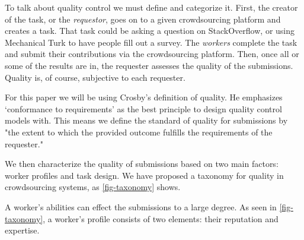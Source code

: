\documentclass{sig-alternate-05-2015}
\begin{document}
	To talk about quality control we must define and categorize it. First, the creator of the task, or the \emph{requestor}, goes on to a given crowdsourcing platform and creates a task. That task could be asking a question on StackOverflow, or using Mechanical Turk to have people fill out a survey. The \emph{workers} complete the task and submit their contributions via the crowdsourcing platform. Then, once all or some of the results are in, the requester assesses the quality of the submissions. Quality is, of course, subjective to each requester. 
	
	For this paper we will be using Crosby's definition of quality. \cite{crosby1996quality} He emphasizes `conformance to requirements' as the best principle to design quality control models with. This means we define the standard of quality for submissions by \\
	"the extent to which the provided outcome fulfills the requirements of the requester."
	
	We then characterize the quality of submissions based on two main factors: worker profiles and task design. We have proposed a taxonomy for quality in crowdsourcing systems, as \cref{fig-taxonomy} shows.
	
	A worker's abilities can effect the submissions to a large degree. \cite{khazankin2012predicting} As seen in \cref{fig-taxonomy}, a worker's profile consists of two elements: their reputation and expertise.
	
\end{document}

